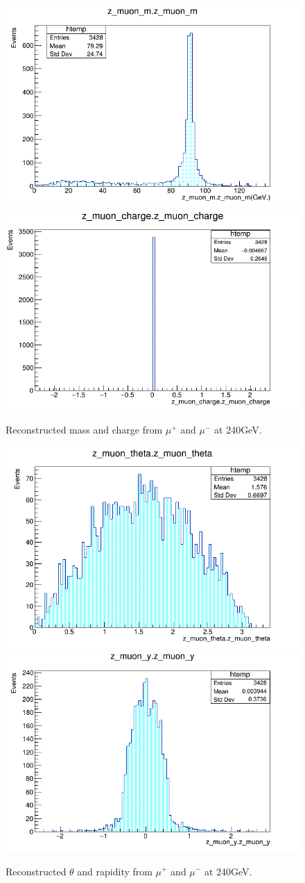 \begin{figure}[ht!]
    \centering
    \includegraphics[width=0.5\linewidth]{plots/plots/zmu_m.png}\hfill
    \includegraphics[width=0.5\linewidth]{plots/plots/zmu_charge.png}
    \caption{Reconstructed mass and charge  from  $\mu^{+}$ and $\mu^{-}$ at 240GeV.}
    \label{fig:zmu_mass}
\end{figure}

\begin{figure}[ht!]
    \centering
    \includegraphics[width=0.5\linewidth]{plots/plots/zmu_theta.png}\hfill
    \includegraphics[width=0.5\linewidth]{plots/plots/zmu_y.png}
    \caption{Reconstructed $\theta$ and rapidity  from  $\mu^{+}$ and $\mu^{-}$ at 240GeV.}
\end{figure}


